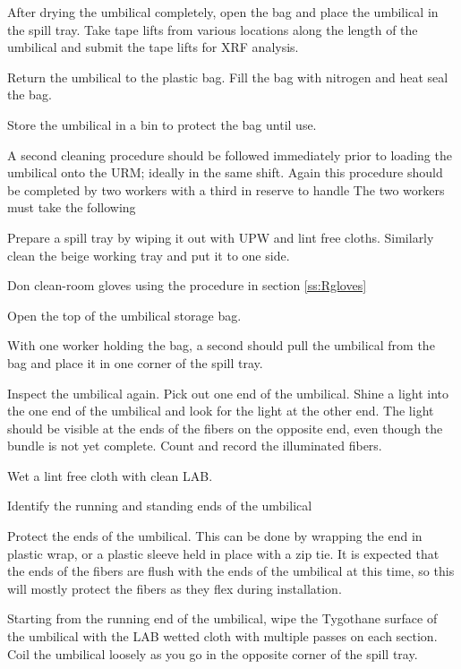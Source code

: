 \documentclass[11pt]{article}
\begin{document}
\begin{answerlist}
\item After drying the umbilical completely, open the bag and place the umbilical in the spill tray. Take tape lifts from various locations along the length of the umbilical and submit the tape lifts for XRF analysis. 
\item Return the umbilical to the plastic bag. Fill the bag with nitrogen and heat seal the bag.
\item Store the umbilical in a bin to protect the bag until use. 
\end{answerlist}
A second cleaning procedure should be followed immediately prior to loading the umbilical onto the URM; ideally in the same shift. Again this procedure should be completed by two workers with a third in reserve to handle 
The two workers must take the following 
\begin{answerlist}
\item Prepare a spill tray by wiping it out with UPW and lint free
  cloths. Similarly clean the beige working tray and put it to one
  side.
\item Don clean-room gloves using the procedure in section \ref{ss:Rgloves}
\item Open the top of the umbilical storage bag. 
\item With one worker holding the bag, a second should pull the
  umbilical from the bag and place it in one corner of the spill tray.
\item Inspect the umbilical again. Pick out one end of the
  umbilical. Shine a light into the one end of the umbilical and look
  for the light at the other end. The light should be visible at the
  ends of the fibers on the opposite end, even though the bundle is
  not yet complete. Count and record the illuminated fibers.
\item Wet a lint free cloth with clean LAB.
\item Identify the running and standing ends of the umbilical 
\item Protect the ends of the umbilical. This can be done by wrapping the end in plastic wrap, or a plastic sleeve held in place with a zip tie. It is expected that the ends of the fibers are flush with the ends of the umbilical at this time, so this will mostly protect the fibers as they flex during installation. 
\item Starting from the running end of the umbilical, wipe the
  Tygothane surface of the umbilical with the LAB wetted cloth with
  multiple passes on each section. Coil the umbilical loosely as you
  go in the opposite corner of the spill tray.

\end{answerlist}
\end{document}
